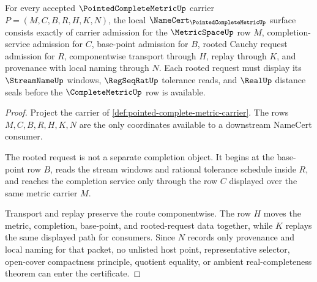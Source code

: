 \begin{theorem}
\label{thm:pointed-complete-metric-namecert-obligations}
For every accepted $\PointedCompleteMetricUp$ carrier
$P=(M,C,B,R,H,K,N)$, the local
$\NameCert_{\PointedCompleteMetricUp}$ surface consists exactly of carrier
admission for the $\MetricSpaceUp$ row $M$, completion-service admission for
$C$, base-point admission for $B$, rooted Cauchy request admission for $R$,
componentwise transport through $H$, replay through $K$, and provenance with
local naming through $N$. Each rooted request must display its
$\StreamNameUp$ windows, $\RegSeqRatUp$ tolerance reads, and $\RealUp$
distance seals before the $\CompleteMetricUp$ row is available.
\end{theorem}
\begin{proof}
Project the carrier of \autoref{def:pointed-complete-metric-carrier}. The
rows $M,C,B,R,H,K,N$ are the only coordinates available to a downstream
NameCert consumer.

The rooted request is not a separate completion object. It begins at the
base-point row $B$, reads the stream windows and rational tolerance schedule
inside $R$, and reaches the completion service only through the row $C$
displayed over the same metric carrier $M$.

Transport and replay preserve the route componentwise. The row $H$ moves the
metric, completion, base-point, and rooted-request data together, while $K$
replays the same displayed path for consumers. Since $N$ records only
provenance and local naming for that packet, no unlisted host point,
representative selector, open-cover compactness principle, quotient equality,
or ambient real-completeness theorem can enter the certificate.
\end{proof}

